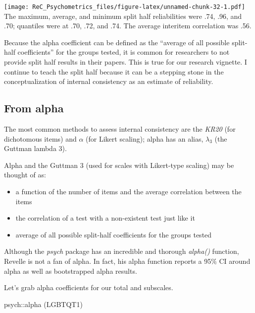 \documentclass[
  english,
]{book}
\newenvironment{Shaded}{\begin{snugshade}}{\end{snugshade}}
\newcommand{\FunctionTok}[1]{\textcolor[rgb]{0.00,0.00,0.00}{#1}}
\newcommand{\NormalTok}[1]{#1}
\newcommand{\SpecialCharTok}[1]{\textcolor[rgb]{0.00,0.00,0.00}{#1}}
\providecommand{\tightlist}{%
  \setlength{\itemsep}{0pt}\setlength{\parskip}{0pt}}
\begin{document}
\texttt{[image: ReC\_Psychometrics\_files/figure-latex/unnamed-chunk-32-1.pdf]}
The maximum, average, and minimum split half reliabilities were .74, .96, and .70; quantiles were at .70, .72, and .74. The average interitem correlation was .56.

Because the alpha coefficient can be defined as the ``average of all possible split-half coefficients'' for the groups tested, it is common for researchers to not provide split half results in their papers. This is true for our research vignette. I continue to teach the split half because it can be a stepping stone in the conceptualization of internal consistency as an estimate of reliability.

\hypertarget{from-alpha}{%
\subsection{From alpha}\label{from-alpha}}

The most common methods to assess internal consistency are the \emph{KR20} (for dichotomous items) and \(\alpha\) (for Likert scaling); alpha has an alias, \(\lambda _{3}\) (the Guttman lambda 3).

Alpha and the Guttman 3 (used for scales with Likert-type scaling) may be thought of as:

\begin{itemize}
\tightlist
\item
  a function of the number of items and the average correlation between the items
\item
  the correlation of a test with a non-existent test just like it
\item
  average of all possible split-half coefficients for the groups tested
\end{itemize}

Although the \emph{psych} package has an incredible and thorough \emph{alpha()} function, Revelle is not a fan of alpha. In fact, his alpha function reports a 95\% CI around alpha as well as bootstrapped alpha results.

Let's grab alpha coefficients for our total and subscales.

\begin{Shaded}
\begin{Highlighting}[]
\NormalTok{psych}\SpecialCharTok{::}\FunctionTok{alpha}\NormalTok{ (LGBTQT1)}
\end{Highlighting}
\end{Shaded}
\end{document}

